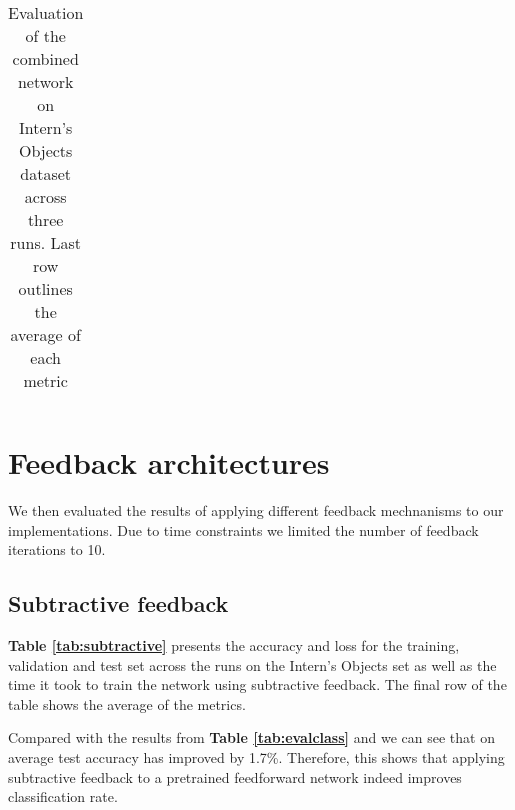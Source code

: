 \documentclass{l4proj}
\begin{document}
\begin{table}[H]
\begin{tabular}{|l|l|l|l|l|l|l|l|}
\end{tabular}
\caption{Evaluation of the combined network on Intern's Objects dataset across three runs. Last row outlines the average of each metric}
\label{tab:evalcombined}
\end{table}


\section{Feedback architectures}
We then evaluated the results of applying different feedback mechnanisms to our implementations. Due to time constraints we limited the number of feedback iterations to 10.

\subsection{Subtractive feedback}
\label{evalsubtr}
\textbf{Table \ref{tab:subtractive}} presents the accuracy and loss for the training, validation and test set across the runs on the Intern's Objects set as well as the time it took to train the network using subtractive feedback. The final row of the table shows the average of the metrics.

Compared with the results from \textbf{Table \ref{tab:evalclass}} and we can see that on average test accuracy has improved by 1.7\%. Therefore, this shows that applying subtractive feedback to a pretrained feedforward network indeed improves classification rate.
\end{document}
